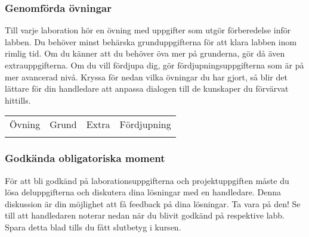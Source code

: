 
\label{progress-protocoll} 


\subsubsection*{Genomförda övningar}

\vspace{1em}\noindent 
{Till varje laboration hör en övning med uppgifter som utgör förberedelse inför labben. Du behöver minst behärska grunduppgifterna för att klara labben inom rimlig tid. Om du känner att du behöver öva mer på grunderna, gör då även extrauppgifterna. Om du vill fördjupa dig, gör fördjupningsuppgifterna som är på mer avancerad nivå. Kryssa för nedan vilka övningar du har gjort, så blir det lättare för din handledare att anpassa dialogen till de kunskaper du förvärvat hittills.}

\newcommand{\TickBox}{\raisebox{-.50ex}{\Large$\square$}}
\newcommand{\ExeRow}[1]{\hyperref[section:exe:#1]{\texttt{#1}} & \TickBox  &  \TickBox &  \TickBox  \\ \addlinespace }

\begin{table}[h]
\centering
\vspace{2em}
\begin{tabular}{lccc}
\toprule \addlinespace 
{\sffamily\small Övning} & 
{\sffamily\small Grund} &	
{\sffamily\small Extra} &
{\sffamily\small Fördjupning}\\ \addlinespace \midrule \\[-0.7em]

\bottomrule
\end{tabular}
\end{table}

\newpage

\subsubsection*{Godkända obligatoriska moment}

\vspace{1em}\noindent 
För att bli godkänd på laborationsuppgifterna och projektuppgiften måste du lösa deluppgifterna och diskutera dina lösningar med en handledare. Denna diskussion är din möjlighet att få feedback på dina lösningar. Ta vara på den!
Se till att handledaren noterar nedan när du blivit godkänd på respektive labb. Spara detta blad tills du fått slutbetyg i kursen. 


